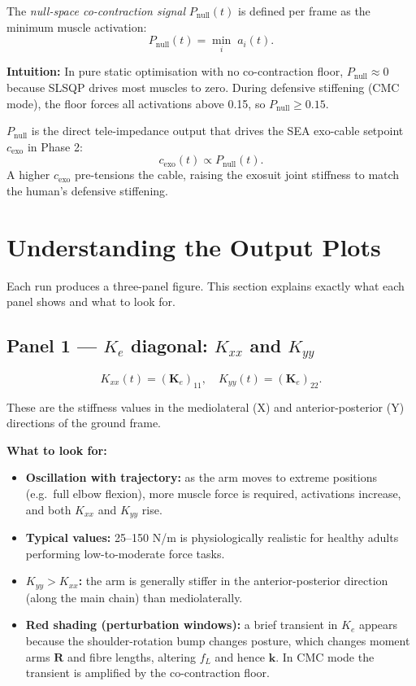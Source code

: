 \documentclass[11pt,a4paper]{article}
\begin{document}
The \emph{null-space co-contraction signal} $P_\text{null}(t)$ is defined
per frame as the minimum muscle activation:
\[
  P_\text{null}(t) = \min_i\; a_i(t).
\]

\textbf{Intuition:} In pure static optimisation with no co-contraction
floor, $P_\text{null}\approx 0$ because SLSQP drives most muscles to zero.
During defensive stiffening (CMC mode), the floor forces all activations
above 0.15, so $P_\text{null}\ge 0.15$.

$P_\text{null}$ is the direct tele-impedance output that drives the SEA
exo-cable setpoint $c_\text{exo}$ in Phase 2:
\[
  c_\text{exo}(t) \propto P_\text{null}(t).
\]
A higher $c_\text{exo}$ pre-tensions the cable, raising the exosuit joint
stiffness to match the human's defensive stiffening.

\section{Understanding the Output Plots}

Each run produces a three-panel figure.  This section explains exactly what
each panel shows and what to look for.

\subsection{Panel 1 --- \texorpdfstring{$K_e$}{Ke} diagonal: \texorpdfstring{$K_{xx}$}{Kxx} and \texorpdfstring{$K_{yy}$}{Kyy}}

\[
  K_{xx}(t) = (\mathbf{K}_e)_{11},\quad K_{yy}(t) = (\mathbf{K}_e)_{22}.
\]

These are the stiffness values in the mediolateral (X) and
anterior-posterior (Y) directions of the ground frame.

\textbf{What to look for:}
\begin{itemize}
  \item \textbf{Oscillation with trajectory:} as the arm moves to extreme
        positions (e.g.\ full elbow flexion), more muscle force is required,
        activations increase, and both $K_{xx}$ and $K_{yy}$ rise.
  \item \textbf{Typical values:} 25--150 N/m is physiologically realistic
        for healthy adults performing low-to-moderate force tasks.
  \item \textbf{$K_{yy} > K_{xx}$:} the arm is generally stiffer in the
        anterior-posterior direction (along the main chain) than mediolaterally.
  \item \textbf{Red shading (perturbation windows):} a brief transient in
        $K_e$ appears because the shoulder-rotation bump changes posture,
        which changes moment arms $\mathbf{R}$ and fibre lengths, altering
        $f_L$ and hence $\bm{k}$.  In CMC mode the transient is amplified
        by the co-contraction floor.
\end{itemize}
\end{document}
